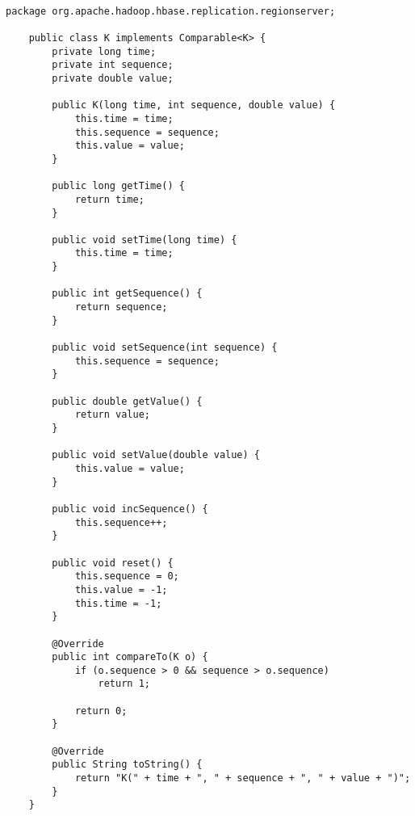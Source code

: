 \begin{lstlisting}[caption={K.java},label={lst:vector-listing}]

package org.apache.hadoop.hbase.replication.regionserver;

	public class K implements Comparable<K> {
	    private long time;
	    private int sequence;
	    private double value;

	    public K(long time, int sequence, double value) {
	        this.time = time;
	        this.sequence = sequence;
	        this.value = value;
	    }

	    public long getTime() {
	        return time;
	    }

	    public void setTime(long time) {
	        this.time = time;
	    }

	    public int getSequence() {
	        return sequence;
	    }

	    public void setSequence(int sequence) {
	        this.sequence = sequence;
	    }

	    public double getValue() {
	        return value;
	    }

	    public void setValue(double value) {
	        this.value = value;
	    }

	    public void incSequence() {
	        this.sequence++;
	    }

	    public void reset() {
	        this.sequence = 0;
	        this.value = -1;
	        this.time = -1;
	    }

	    @Override
	    public int compareTo(K o) {
	        if (o.sequence > 0 && sequence > o.sequence)
	            return 1;

	        return 0;
	    }

	    @Override
	    public String toString() {
	        return "K(" + time + ", " + sequence + ", " + value + ")";
	    }
	}

\end{lstlisting}

